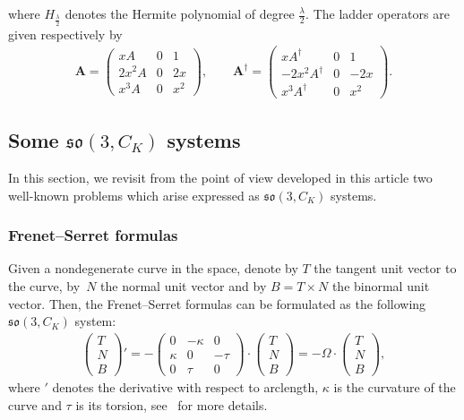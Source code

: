 \documentclass[10pt,a4paper]{amsart}
\numberwithin{equation}{section}
\begin{document}
where $H_{\frac{\lambda}{2}}$ denotes the Hermite polynomial of degree $\frac{\lambda}{2}$. The ladder operators are given respectively by
\begin{gather*}
\mathbf{A}=\begin{pmatrix}
xA&0&1\\2x^2A&0&2x\\x^3A&0&x^2
\end{pmatrix}\!, \qquad
\mathbf{A}^\dag=\begin{pmatrix}
xA^\dag&0&1\\-2x^2A^\dag&0&-2x\\x^3A^\dag&0&x^2
\end{pmatrix}\!.
\end{gather*}

\subsection{Some \texorpdfstring{$\mathfrak{so}(3, C_K)$}{so(3,C\_K)} systems}\label{sec:applic-so3}

In this section, we revisit from the point of view developed in this article two well-known problems which arise expressed as $\mathfrak{so}(3, C_K)$ systems.


\subsubsection{Frenet--Serret formulas}

Given a nondegenerate curve in the space, denote by $T$ the tangent unit vector to the curve, by~$N$ the normal unit vector and by $B = T \times N$ the binormal unit vector. Then, the Frenet--Serret formulas can be formulated as the following $\mathfrak{so}(3, C_K)$ system:
\begin{gather}
\begin{pmatrix} T \\ N \\ B \end{pmatrix}' = - \begin{pmatrix}
0 & -\kappa & 0 \\ \kappa & 0 & - \tau \\ 0 & \tau & 0 \end{pmatrix} \cdot
\begin{pmatrix} T \\ N \\ B \end{pmatrix} = - \Omega \cdot \begin{pmatrix} T \\ N \\ B \end{pmatrix}\!,
\end{gather}
where $'$ denotes the derivative with respect to arclength, $\kappa$ is the curvature of the curve and $\tau$ is its torsion, see~\cite[Chapter~1]{MSp} for more details.
\end{document}
